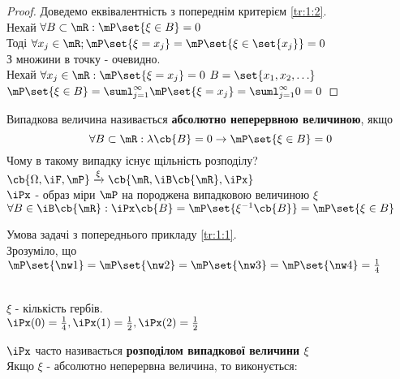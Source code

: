 \begin{proof}
Доведемо еквівалентність з попереднім критерієм \ref{tr:1:2}.\\
Нехай $\forall B\subset\mR:\mP\set{\xi\in B} =0$\\
Тоді $\forall x_j\in\mR;\mP\set{\xi=x_j} = \mP\set{\xi\in\set{x_j}} = 0 $\\
З множини в точку - очевидно.\\
Нехай $\forall x_j \in \mR: \mP\set{\xi=x_j}=0$
$B=\set{x_1,x_2,\ldots}$\\
$\mP\set{\xi\in B} = \suml_{j=1}^\infty \mP\set{\xi=x_j} = \suml_{j=1}^\infty 0 = 0$
\end{proof}
Випадкова величина називається {\bf абсолютно неперервною величиною}, якщо
\begin{equation}
\forall B\subset\mR:\lambda\cb{B} =0\rightarrow\mP\set{\xi\in B}=0
\end{equation}
Чому в такому випадку існує щільність розподілу?\\
$\cb{\Omega,\iF,\mP} \xrightarrow{\xi} \cb{\mR,\iB\cb{\mR},\iPx}$\\
$\iPx$ - образ міри $\mP$ на \cb{\mR,\iB\cb{\mR}} породжена випадковою величиною $\xi$\\
$\forall B\in\iB\cb{\mR}:\iPx\cb{B} = \mP\set{\xi^{-1}\cb{B}} = \mP\set{\xi\in B}$
\begin{exs}
Умова задачі з попереднього прикладу \ref{tr:1:1}.\\
Зрозуміло, що $\mP\set{\nw1} = \mP\set{\nw2} = \mP\set{\nw3} = \mP\set{\nw4} = \frac14$\\
\\
$\xi$ - кількість гербів. \\
$\iPx(0)=\frac14,\iPx(1)=\frac12,\iPx(2)=\frac12$
\end{exs}
$\iPx$ часто називається {\bf розподілом випадкової величини $\xi$}\\
Якщо $\xi$ - абсолютно неперервна величина, то виконується:
